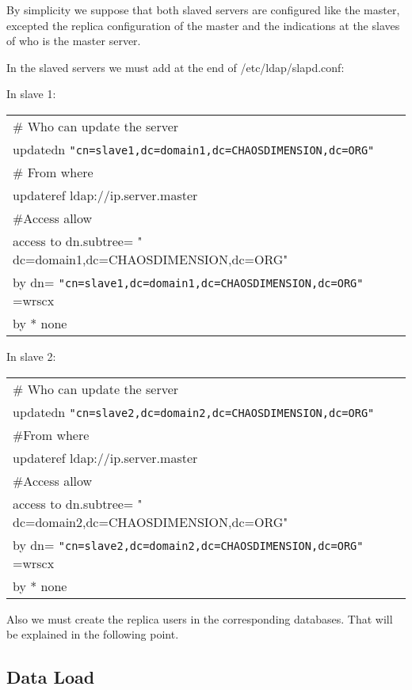 By simplicity we suppose that both slaved servers are configured like the master, excepted the replica configuration of the master and the indications at the slaves of who is the master server.

In the slaved servers we must add at the end of /etc/ldap/slapd.conf: 

In slave 1:\\

\begin{tabular}{|ll|}\hline
\# Who can update the server & \\
updatedn \verb|"cn=slave1,dc=domain1,dc=CHAOSDIMENSION,dc=ORG"| & \\
\# From where & \\
updateref ldap://ip.server.master & \\
\#Access allow & \\
access to dn.subtree= " dc=domain1,dc=CHAOSDIMENSION,dc=ORG" & \\
by dn= \verb|"cn=slave1,dc=domain1,dc=CHAOSDIMENSION,dc=ORG"|  =wrscx & \\
by * none & \\
\hline\end{tabular}
\vspace{0.5cm}

In slave 2:\\

\begin{tabular}{|ll|}\hline
\# Who can update the server & \\
updatedn \verb|"cn=slave2,dc=domain2,dc=CHAOSDIMENSION,dc=ORG"| & \\
\#From where & \\
updateref ldap://ip.server.master & \\
\#Access allow & \\
access to dn.subtree= " dc=domain2,dc=CHAOSDIMENSION,dc=ORG" & \\
by dn= \verb|"cn=slave2,dc=domain2,dc=CHAOSDIMENSION,dc=ORG"| =wrscx & \\
by * none & \\
\hline\end{tabular}
\vspace{0.5cm}

Also we must create the replica users in the corresponding databases. That will be explained in the following point.

\subsection{Data Load}


